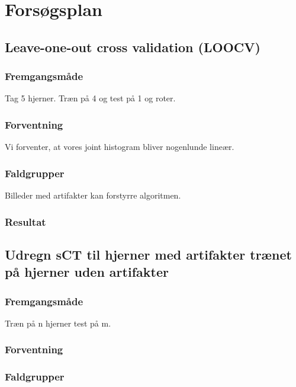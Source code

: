 \section{Forsøgsplan}

\subsection{Leave-one-out cross validation (LOOCV)}
\subsubsection{Fremgangsmåde}
Tag 5 hjerner. Træn på 4 og test på 1 og roter.


\subsubsection{Forventning}
Vi forventer, at vores joint histogram bliver nogenlunde lineær. 

\subsubsection{Faldgrupper}
Billeder med artifakter kan forstyrre algoritmen. 

\subsubsection{Resultat}

\subsection{Udregn sCT til hjerner med artifakter trænet på hjerner uden artifakter}
\subsubsection{Fremgangsmåde}
Træn på n hjerner test på m.

\subsubsection{Forventning}

\subsubsection{Faldgrupper}

